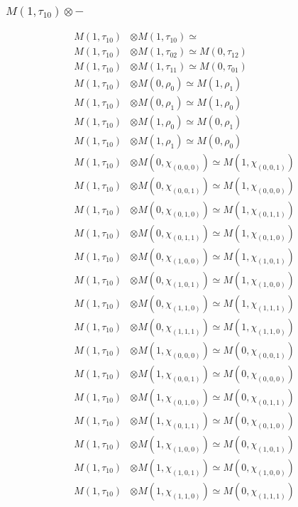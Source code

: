 \subsubsection{$ M(1,\tau_{10})\otimes -$}
\begin{align*}
M(1,\tau_{10}) &\otimes M(1,\tau_{10}) \simeq  \\
M(1,\tau_{10}) &\otimes M(1,\tau_{02}) \simeq M(0,\tau_{12}) \\
M(1,\tau_{10}) &\otimes M(1,\tau_{11}) \simeq M(0,\tau_{01}) \\
M(1,\tau_{10}) &\otimes M(0,\rho_{0}) \simeq M(1,\rho_{1}) \\
M(1,\tau_{10}) &\otimes M(0,\rho_{1}) \simeq M(1,\rho_{0}) \\
M(1,\tau_{10}) &\otimes M(1,\rho_{0}) \simeq M(0,\rho_{1}) \\
M(1,\tau_{10}) &\otimes M(1,\rho_{1}) \simeq M(0,\rho_{0}) \\
M(1,\tau_{10}) &\otimes M(0,\chi_{(0,0,0)}) \simeq M(1,\chi_{(0,0,1)}) \\
M(1,\tau_{10}) &\otimes M(0,\chi_{(0,0,1)}) \simeq M(1,\chi_{(0,0,0)}) \\
M(1,\tau_{10}) &\otimes M(0,\chi_{(0,1,0)}) \simeq M(1,\chi_{(0,1,1)}) \\
M(1,\tau_{10}) &\otimes M(0,\chi_{(0,1,1)}) \simeq M(1,\chi_{(0,1,0)}) \\
M(1,\tau_{10}) &\otimes M(0,\chi_{(1,0,0)}) \simeq M(1,\chi_{(1,0,1)}) \\
M(1,\tau_{10}) &\otimes M(0,\chi_{(1,0,1)}) \simeq M(1,\chi_{(1,0,0)}) \\
M(1,\tau_{10}) &\otimes M(0,\chi_{(1,1,0)}) \simeq M(1,\chi_{(1,1,1)}) \\
M(1,\tau_{10}) &\otimes M(0,\chi_{(1,1,1)}) \simeq M(1,\chi_{(1,1,0)}) \\
M(1,\tau_{10}) &\otimes M(1,\chi_{(0,0,0)}) \simeq M(0,\chi_{(0,0,1)}) \\
M(1,\tau_{10}) &\otimes M(1,\chi_{(0,0,1)}) \simeq M(0,\chi_{(0,0,0)}) \\
M(1,\tau_{10}) &\otimes M(1,\chi_{(0,1,0)}) \simeq M(0,\chi_{(0,1,1)}) \\
M(1,\tau_{10}) &\otimes M(1,\chi_{(0,1,1)}) \simeq M(0,\chi_{(0,1,0)}) \\
M(1,\tau_{10}) &\otimes M(1,\chi_{(1,0,0)}) \simeq M(0,\chi_{(1,0,1)}) \\
M(1,\tau_{10}) &\otimes M(1,\chi_{(1,0,1)}) \simeq M(0,\chi_{(1,0,0)}) \\
M(1,\tau_{10}) &\otimes M(1,\chi_{(1,1,0)}) \simeq M(0,\chi_{(1,1,1)}) \\

\end{align*}
